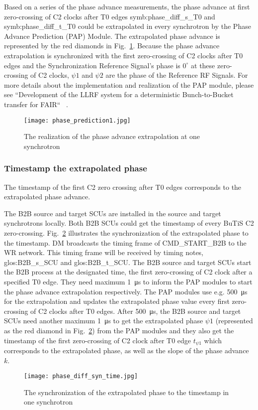 Based on a series of the phase advance measurements, the phase advance at first zero-crossing of C2 clocks after T0 edges \gls{symb:phase_diff_s_T0} and \gls{symb:phase_diff_t_T0} could be extrapolated in every synchrotron by the Phase Advance Prediction (\gls{PAP}) Module. The extrapolated phase advance is represented by the red diamonds in Fig.~\ref{phase_prediction1}. Because the phase advance extrapolation is synchronized with the first zero-crossing of C2 clocks after T0 edges and the Synchronization Reference Signal's phase is $0^\circ$ at these zero-crossing of C2 clocks, $\psi1$ and $\psi2$ are the phase of the Reference RF Signals. For more details about the implementation and realization of the PAP module, please see ``Development of the LLRF system for a deterministic Bunch-to-Bucket transfer for FAIR`` ~\cite{ferrand_development_????}.   
\begin{figure}[H]
   \centering   
   \texttt{[image: phase\_prediction1.jpg]}
   \caption{The realization of the phase advance extrapolation at one synchrotron}
   \label{phase_prediction1}
\end{figure}
\subsubsection{Timestamp the extrapolated phase}
The timestamp of the first C2 zero crossing after T0 edges corresponds to the extrapolated phase advance.

The B2B source and target SCUs are installed in the source and target synchrotrons locally. Both B2B SCUs could get the timestamp of every BuTiS C2 zero-crossing. Fig.~\ref{phase_diff_syn_time} illustrates the synchronization of the extrapolated phase to the timestamp. DM broadcasts the timing frame of CMD\_START\_B2B to the WR network. This timing frame will be received by timing notes, \gls{glos:B2B_s_SCU} and \gls{glos:B2B_t_SCU}. The B2B source and target SCUs start the B2B process at the designated time, the first zero-crossing of C2 clock after a specified T0 edge. They need maximum \SI{1}{\us} to inform the PAP modules to start the phase advance extrapolation respectively. The PAP modules use e.g. \SI{500}{\us} for the extrapolation and updates the extrapolated phase value every first zero-crossing of C2 clocks after T0 edges. After \SI{500}{\us}, the B2B source and target SCUs need another maximum \SI{1}{\us} to get the extrapolated phase $\psi1$ (represented as the red diamond in Fig.~\ref{phase_diff_syn_time}) from the PAP modules and they also get the timestamp of the first zero-crossing of C2 clock after T0 edge $t_{\psi1}$ which corresponds to the extrapolated phase, as well as the slope of the phase advance $k$.  
 \begin{figure}[!htb]
   \centering   
   \texttt{[image: phase\_diff\_syn\_time.jpg]}
   \caption{The synchronization of the extrapolated phase to the timestamp in one synchrotron}
   \label{phase_diff_syn_time}
\end{figure}
